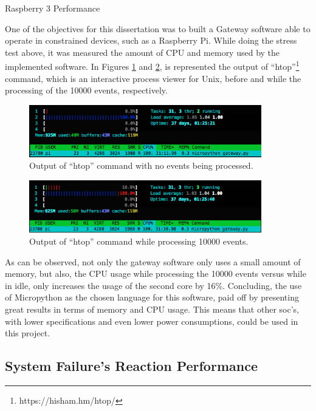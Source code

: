 \begin{Paragraph}{Raspberry 3 Performance}


One of the objectives for this dissertation was to built a Gateway software able to operate in constrained devices, such as a Raspberry Pi. While doing the stress test above, it was measured the amount of CPU and memory used by the implemented software. In Figures \ref{fig:idle} and \ref{fig:loaded}, is represented the output of ``htop''\footnote{https://hisham.hm/htop/} command, which is an interactive process viewer for Unix, before and while the processing of the 10000 events, respectively.


 \begin{figure}[H]
 	\centering
 	\includegraphics[width=0.9\textwidth]{figures/idle.png}
 	\caption{Output of ``htop'' command with no events being processed.}
 	\label{fig:idle}
 \end{figure}

\begin{figure}[H]
	\centering
	\includegraphics[width=0.9\textwidth]{figures/loaded.png}
	\caption{Output of ``htop'' command while processing 10000 events.}
	\label{fig:loaded}
\end{figure}

As can be observed, not only the gateway software only uses a small amount of memory, but also, the CPU usage while processing the 10000 events versus while in idle, only increases the usage of the second core by 16\%. Concluding, the use of Micropython as the chosen language for this software, paid off by presenting great results in terms of memory and CPU usage. This means that other \ac{soc}'s, with lower specifications and even lower power consumptions, could be used in this project.

\end{Paragraph}

\subsection{System Failure's Reaction Performance}
\label{results:fail}

